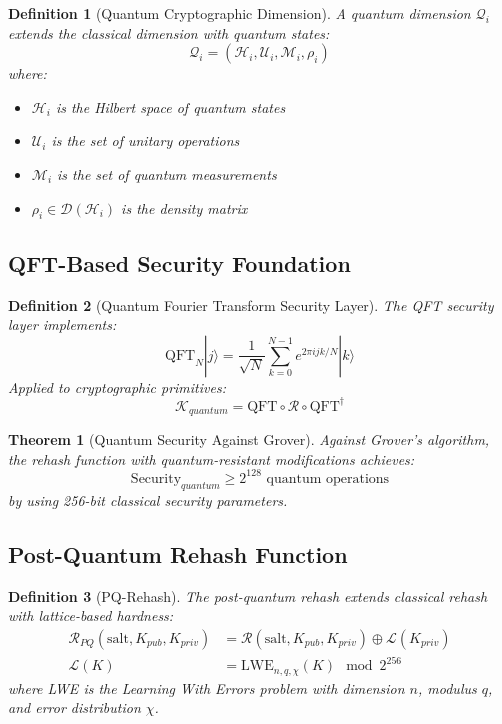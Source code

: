 \documentclass[11pt]{article}
\newtheorem{definition}{Definition}
\newtheorem{theorem}{Theorem}
\begin{document}
\begin{definition}[Quantum Cryptographic Dimension]
A quantum dimension $\mathcal{Q}_i$ extends the classical dimension with quantum states:
\[\mathcal{Q}_i = (\mathcal{H}_i, \mathcal{U}_i, \mathcal{M}_i, \rho_i)\]
where:
\begin{itemize}
    \item $\mathcal{H}_i$ is the Hilbert space of quantum states
    \item $\mathcal{U}_i$ is the set of unitary operations
    \item $\mathcal{M}_i$ is the set of quantum measurements
    \item $\rho_i \in \mathcal{D}(\mathcal{H}_i)$ is the density matrix
\end{itemize}
\end{definition}

\subsection{QFT-Based Security Foundation}

\begin{definition}[Quantum Fourier Transform Security Layer]
The QFT security layer implements:
\[\text{QFT}_{N}|j\rangle = \frac{1}{\sqrt{N}} \sum_{k=0}^{N-1} e^{2\pi ijk/N}|k\rangle\]
Applied to cryptographic primitives:
\[\mathcal{K}_{quantum} = \text{QFT} \circ \mathcal{R} \circ \text{QFT}^{\dagger}\]
\end{definition}

\begin{theorem}[Quantum Security Against Grover]
Against Grover's algorithm, the rehash function with quantum-resistant modifications achieves:
\[\text{Security}_{quantum} \geq 2^{128} \text{ quantum operations}\]
by using 256-bit classical security parameters.
\end{theorem}

\subsection{Post-Quantum Rehash Function}

\begin{definition}[PQ-Rehash]
The post-quantum rehash extends classical rehash with lattice-based hardness:
\begin{align}
\mathcal{R}_{PQ}(\text{salt}, K_{pub}, K_{priv}) &= \mathcal{R}(\text{salt}, K_{pub}, K_{priv}) \oplus \mathcal{L}(K_{priv})\\
\mathcal{L}(K) &= \text{LWE}_{n,q,\chi}(K) \mod 2^{256}
\end{align}
where LWE is the Learning With Errors problem with dimension $n$, modulus $q$, and error distribution $\chi$.
\end{definition}
\end{document}
